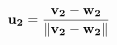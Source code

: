 \documentclass[preview]{standalone}
\begin{document}
\begin{align*}
\mathbf{u_2} = { \mathbf{v_2} - \mathbf{w_2} \over \|   \mathbf{v_2}   - \mathbf{w_2} \|}
\end{align*}
\end{document}
